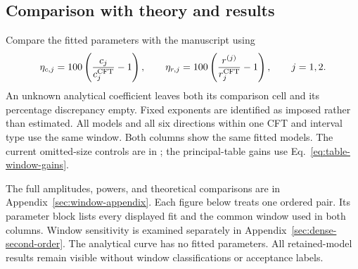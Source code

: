 \subsection{Comparison with theory and results}
Compare the fitted parameters with the manuscript using
\begin{equation}
 \eta_{c,j}=100\left(\frac{c_j}{c_j^{\rm CFT}}-1\right),\qquad
 \eta_{r,j}=100\left(\frac{r^{(j)}}{r_j^{\rm CFT}}-1\right),
 \qquad j=1,2.
 \label{eq:window-discrepancies}
\end{equation}
An unknown analytical coefficient leaves both its comparison cell
and its percentage discrepancy empty. Fixed exponents are identified
as imposed rather than estimated. All models and all six directions within one CFT and interval type
use the same window. Both columns show the same fitted models. The current omitted-size
controls are in ; the principal-table gains
use Eq.~\eqref{eq:table-window-gains}.





The full amplitudes, powers, and theoretical comparisons are in
Appendix~\ref{sec:window-appendix}. Each figure below treats one
ordered pair. Its parameter block lists every displayed fit and the common window
used in both columns. Window sensitivity is examined separately in
Appendix~\ref{sec:dense-second-order}.
The analytical curve has no fitted
parameters. All retained-model results remain visible without window
classifications or acceptance labels.




